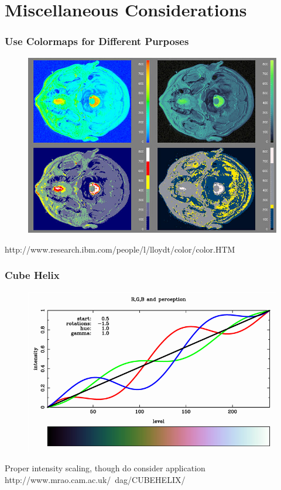 \documentclass[ignorenonframetext]{beamer}
\begin{document}
\section{Miscellaneous Considerations}


\begin{frame}[t]\frametitle{Use Colormaps for Different Purposes}
    \begin{figure}
    	\centering
    	\includegraphics[width=.75\textwidth]{figures/multiple_colormaps}
    \end{figure}
    \tiny{http://www.research.ibm.com/people/l/lloydt/color/color.HTM}
\end{frame}


\begin{frame}[t]\frametitle{Cube Helix}
    \begin{figure}
    	\centering
    	\includegraphics[width=.7\textwidth]{figures/cube_helix}
    \end{figure}
    Proper intensity scaling, though do consider application
    \tiny{http://www.mrao.cam.ac.uk/~dag/CUBEHELIX/}
\end{frame}
\end{document}

